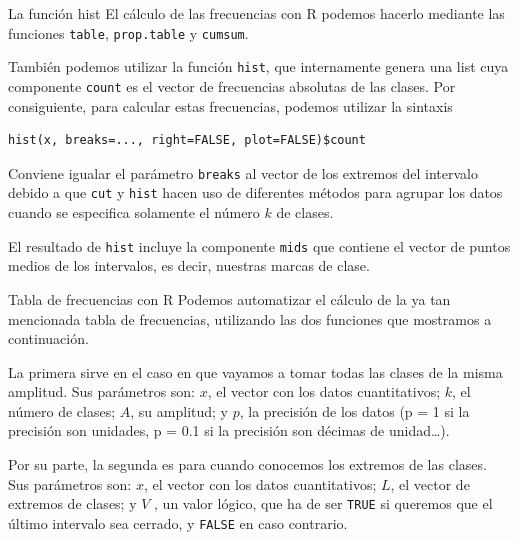 \documentclass[
  ignorenonframetext,
]{beamer}
\begin{document}
\begin{frame}[fragile]{La función hist}
\label{la-funciuxf3n-hist-1}
El cálculo de las frecuencias con R podemos hacerlo mediante las
funciones \texttt{table}, \texttt{prop.table} y \texttt{cumsum}.

También podemos utilizar la función \texttt{hist}, que internamente
genera una list cuya componente \texttt{count} es el vector de
frecuencias absolutas de las clases. Por consiguiente, para calcular
estas frecuencias, podemos utilizar la sintaxis

\begin{verbatim}
hist(x, breaks=..., right=FALSE, plot=FALSE)$count
\end{verbatim}

Conviene igualar el parámetro \texttt{breaks} al vector de los extremos
del intervalo debido a que \texttt{cut} y \texttt{hist} hacen uso de
diferentes métodos para agrupar los datos cuando se especifica solamente
el número \(k\) de clases.

El resultado de \texttt{hist} incluye la componente \texttt{mids} que
contiene el vector de puntos medios de los intervalos, es decir,
nuestras marcas de clase.
\end{frame}

\begin{frame}[fragile]{Tabla de frecuencias con R}
\label{tabla-de-frecuencias-con-r}
Podemos automatizar el cálculo de la ya tan mencionada tabla de
frecuencias, utilizando las dos funciones que mostramos a continuación.

La primera sirve en el caso en que vayamos a tomar todas las clases de
la misma amplitud. Sus parámetros son: \(x\), el vector con los datos
cuantitativos; \(k\), el número de clases; \(A\), su amplitud; y \(p\),
la precisión de los datos (p = 1 si la precisión son unidades, p = 0.1
si la precisión son décimas de unidad\ldots).

Por su parte, la segunda es para cuando conocemos los extremos de las
clases. Sus parámetros son: \(x\), el vector con los datos
cuantitativos; \(L\), el vector de extremos de clases; y \(V\) , un
valor lógico, que ha de ser \texttt{TRUE} si queremos que el último
intervalo sea cerrado, y \texttt{FALSE} en caso contrario.
\end{frame}
\end{document}
